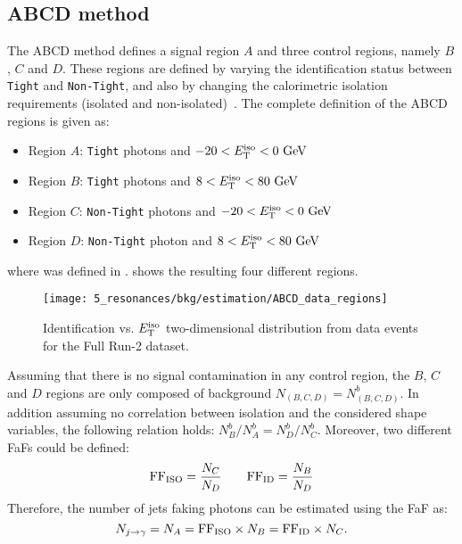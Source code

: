 \subsection{ABCD method}
\label{subsec:bkg:estimation:abcd}

The ABCD method defines a signal region \(A\) and three control regions, namely \(B\), \(C\) and \(D\).
These regions are defined by varying the identification status between \texttt{Tight} and \texttt{Non-Tight}, and also by changing the calorimetric isolation requirements (isolated and non-isolated)~\cite{ATLAS-EXOTICS-Monophoton-2017}.
The complete definition of the ABCD regions is given as:
\begin{itemize}
    \item Region \(A\): \texttt{Tight} photons and \(-20 < E_{\text{T}}^{\text{iso}} < 0~ \text{GeV}\)
    \item Region \(B\): \texttt{Tight} photons and \(8 < E_{\text{T}}^{\text{iso}} < 80~ \text{GeV}\)
    \item Region \(C\): \texttt{Non-Tight} photons and \(-20 < E_{\text{T}}^{\text{iso}} < 0~ \text{GeV}\)
    \item Region \(D\): \texttt{Non-Tight} photon and \(8 < E_{\text{T}}^{\text{iso}} < 80~ \text{GeV}\)
\end{itemize}
where \etiso was defined in \Eqn{\ref{eq:objects:egamma:iso:definitions}}. \Fig{\ref{fig:bkg:estimation:abcd:diagram}} shows the resulting four different regions.

\begin{figure*}[ht!]
    \centering
    \texttt{[image: 5\_resonances/bkg/estimation/ABCD\_data\_regions]}
    \caption{Identification vs. \(E_{\text{T}}^{\text{iso}}\) two-dimensional distribution from data events for the Full Run-2 dataset.}
    \label{fig:bkg:estimation:abcd:diagram}
\end{figure*}

Assuming that there is no signal contamination in any control region, the \(B\), \(C\) and \(D\) regions are only composed of background \(N_{(B,C,D)}=N^{b}_{(B,C,D)}\). In addition assuming no correlation between isolation and the considered shape variables, the following relation holds: \(N^{b}_{B}/N^{b}_{A}=N^{b}_{D}/N^{b}_{C}\). Moreover, two different \acp{FaF} could be defined:
\begin{equation*}
    \text{FF}_{\text{ISO}} = \frac{N_{C}}{N_{D}} \qquad \text{FF}_{\text{ID}} = \frac{N_{B}}{N_{D}}
\end{equation*}
Therefore, the number of jets faking photons can be estimated using the \ac{FaF} as:
\begin{equation}
    \label{eq:bkg:estimation:abcd:njfakes}
    N_{j\rightarrow\gamma} = N_{A} = \text{FF}_{\text{ISO}} \times N_{B}  = \text{FF}_{\text{ID}} \times N_{C}.
\end{equation}

